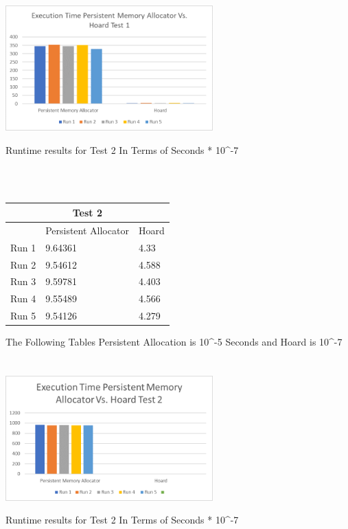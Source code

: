 \documentclass[conference]{IEEEtran}
\begin{document}
\\
\\
\\

\\

\includegraphics[width=8cm]{llllllllll.png}
\caption{Runtime results for Test 2 In Terms of Seconds * 10^-7}
\label{fig4:Test 1}
\\
\\


\begin{tabular}{ |p{1cm}||p{3cm}|p{3cm}|  }
 \hline
 \multicolumn{3}{|c|}{Test 2} \\
 \hline
 & Persistent Allocator & Hoard \\
 \hline
 Run 1   &9.64361    & 4.33\\
 Run 2& 9.54612    &  4.588  \\
 Run 3 &9.59781 &  4.403 \\
 Run 4&9.55489 & 4.566\\
 Run 5&  9.54126  & 4.279\\
 \hline
\end{tabular}
 The Following Tables Persistent Allocation is 10^-5 Seconds and Hoard is 10^-7
\\
\\

\\

\includegraphics[width=8cm]{lll.png}
\caption{Runtime results for Test 2 In Terms of Seconds * 10^-7}
\label{fig5:Test 2}
\\
\end{document}
